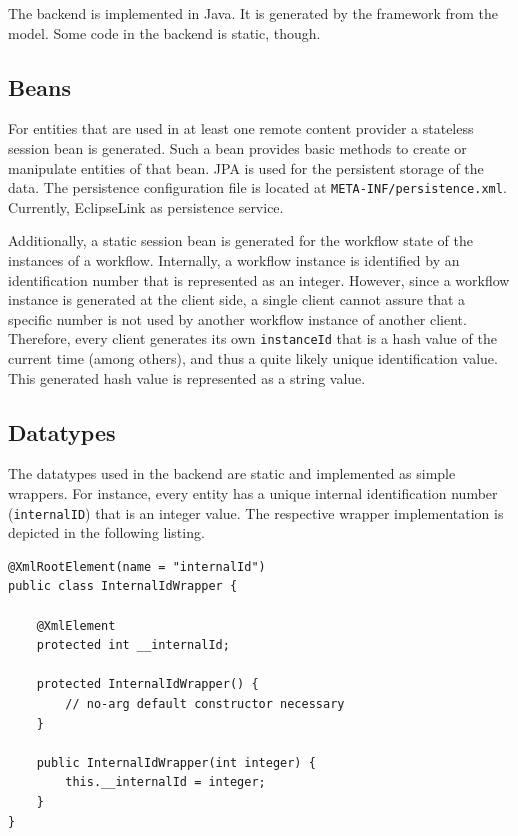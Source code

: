 The \MD backend is implemented in Java. It is generated by the \MD framework from the \MD model. Some code in the backend is static, though. 

\subsection{Beans}
For entities that are used in at least one remote content provider a stateless session bean is generated. Such a bean provides basic methods to create or manipulate entities of that bean. JPA is used for the persistent storage of the data. The persistence configuration file is located at \lstinline|META-INF/persistence.xml|. Currently, EclipseLink as persistence service.

Additionally, a static session bean is generated for the workflow state of the instances of a workflow. Internally, a workflow instance is identified by an identification number that is represented as an integer. However, since a workflow instance is generated at the client side, a single client cannot assure that a specific number is not used by another workflow instance of another client. Therefore, every client generates its own \lstinline|instanceId| that is a hash value of the current time (among others), and thus a quite likely unique identification value. This generated hash value is represented as a string value.

\subsection{Datatypes}
The datatypes used in the backend are static and implemented as simple wrappers. For instance, every entity has a unique internal identification number (\lstinline|internalID|) that is an integer value. The respective wrapper implementation is depicted in the following listing. 

\begin{lstlisting}[language=MD2, label=lst:intIdWrapper, caption=An integer wrapper for the internal identification number]
@XmlRootElement(name = "internalId")
public class InternalIdWrapper {
	
	@XmlElement
	protected int __internalId;
	
	protected InternalIdWrapper() {
		// no-arg default constructor necessary
	}
	
	public InternalIdWrapper(int integer) {
		this.__internalId = integer;
	}
}
\end{lstlisting}

